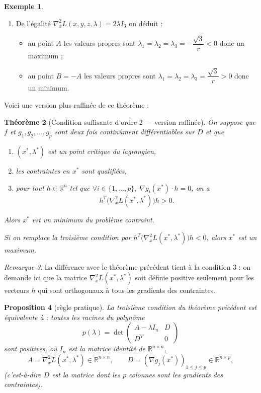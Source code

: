 \documentclass[a4paper,12pt,openany]{book}
\theoremstyle{plain}
\newtheorem{theorem}{Théorème}[section]
\newtheorem{proposition}[theorem]{Proposition}
\theoremstyle{definition}
\newtheorem{example}[theorem]{Exemple}
\theoremstyle{remark}
\newtheorem{remark}[theorem]{Remarque}
\theoremstyle{nbstyle}
\begin{document}
\begin{example}
\begin{enumerate}
			\item De l'égalité \(\nabla^2_x L(x,y,z,\lambda) = 2\lambda I_3\) on déduit :
			\begin{itemize}
				\item au point \(A\) les valeurs propres sont \(\lambda_1=\lambda_2=\lambda_3=-\dfrac{\sqrt{3}}{r}<0\) donc un maximum ;
				\item au point \(B=-A\) les valeurs propres sont \(\lambda_1=\lambda_2=\lambda_3=\dfrac{\sqrt{3}}{r}>0\) donc un minimum.
			\end{itemize}
		\end{enumerate}
	\end{example}
	
	Voici une version plus raffinée de ce théorème :
	
	\begin{theorem}[Condition suffisante d'ordre 2 — version raffinée]
		On suppose que \(f\) et \(g_1,g_2,\dots,g_p\) sont deux fois continûment différentiables sur \(D\) et que
		\begin{enumerate}
			\item \((x^*,\lambda^*)\) est un point critique du lagrangien,
			\item les contraintes en \(x^*\) sont qualifiées,
			\item pour tout \(h\in\mathbb{R}^n\) tel que \(\forall i\in\{1,\dots,p\},\; \nabla g_i(x^*)\cdot h = 0\), on a
			\[
			h^T\big(\nabla^2_x L(x^*,\lambda^*)\big) h > 0.
			\]
		\end{enumerate}
		Alors \(x^*\) est un minimum du problème contraint.
		
		Si on remplace la troisième condition par \(h^T\big(\nabla^2_x L(x^*,\lambda^*)\big) h < 0\), alors \(x^*\) est un maximum.
	\end{theorem}
	
	\begin{remark}
		La différence avec le théorème précédent tient à la condition 3 : on demande ici que la matrice \(\nabla^2_x L(x^*,\lambda^*)\) soit définie positive seulement pour les vecteurs \(h\) qui sont orthogonaux à tous les gradients des contraintes.
	\end{remark}
	
	\begin{proposition}[règle pratique]
		La troisième condition du théorème précédent est équivalente à : toutes les racines du polynôme
		\[
		p(\lambda)=\det\begin{pmatrix} A-\lambda I_n & D \\ D^T & 0 \end{pmatrix}
		\]
		sont positives, où \(I_n\) est la matrice identité de \(\mathbb{R}^{n\times n}\),
		\[
		A=\nabla^2_x L(x^*,\lambda^*)\in\mathbb{R}^{n\times n},\qquad
		D=(\nabla g_j(x^*))_{1\le j\le p}\in\mathbb{R}^{n\times p},
		\]
		(c'est-à-dire \(D\) est la matrice dont les \(p\) colonnes sont les gradients des contraintes).
	\end{proposition}
	
\end{document}
